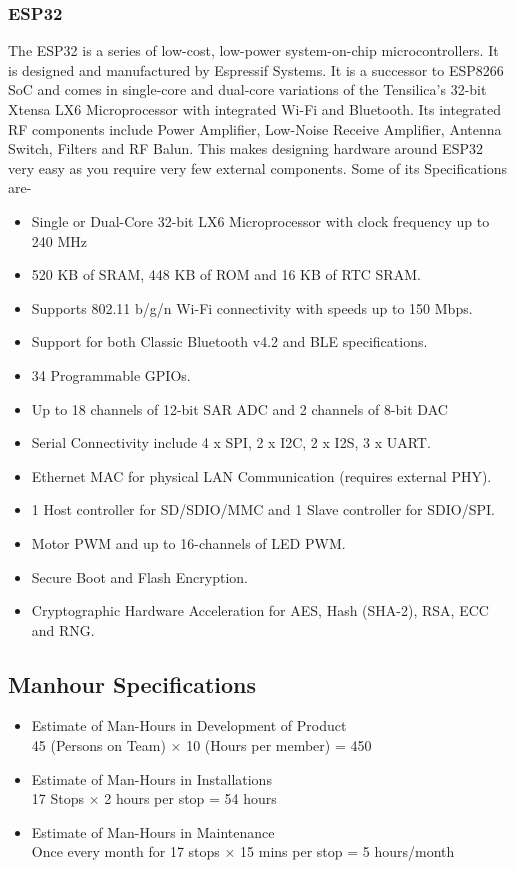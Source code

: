 \documentclass[12pt]{article} %
\begin{document}
\subsubsection{\gls{ESP32}}
The ESP32\cite{noauthor_introduction_nodate} is a series of low-cost, low-power system-on-chip microcontrollers. It is designed and manufactured by Espressif Systems.
It is a successor to ESP8266 SoC and comes in single-core and dual-core variations of the Tensilica’s 32-bit Xtensa LX6 Microprocessor with integrated Wi-Fi and Bluetooth. Its integrated RF components include Power Amplifier, Low-Noise Receive Amplifier, Antenna Switch, Filters and RF Balun. This makes designing hardware around ESP32 very easy as you require very few external components.
Some of its Specifications are-

\begin{itemize}
    \item Single or Dual-Core 32-bit LX6 Microprocessor with clock frequency up to 240 MHz
    \item 520 KB of SRAM, 448 KB of ROM and 16 KB of RTC SRAM.
    \item Supports 802.11 b/g/n Wi-Fi connectivity with speeds up to 150 Mbps.
    \item Support for both Classic Bluetooth v4.2 and BLE specifications.
    \item 34 Programmable GPIOs.
    \item Up to 18 channels of 12-bit SAR ADC and 2 channels of 8-bit DAC
    \item Serial Connectivity include 4 x SPI, 2 x I2C, 2 x I2S, 3 x UART.
    \item Ethernet MAC for physical LAN Communication (requires external PHY).
    \item 1 Host controller for SD/SDIO/MMC and 1 Slave controller for SDIO/SPI.
    \item Motor \acrshort{PWM} and up to 16-channels of LED \acrshort{PWM}.
    \item Secure Boot and Flash Encryption.
    \item Cryptographic Hardware Acceleration for AES, Hash (SHA-2), RSA, ECC and RNG.
\end{itemize}

\subsection{Manhour Specifications}
\begin{itemize}
    \item Estimate of Man-Hours in Development of Product
\\45 (Persons on Team) $\times$ 10 (Hours per member) = 450 
\item Estimate of Man-Hours in Installations
\\17 Stops $\times$ 2 hours per stop = 54 hours
\item Estimate of Man-Hours in Maintenance 
\\ Once every month for 17 stops $\times$ 15 mins per stop = 5 hours/month
\end{itemize}
\end{document}
